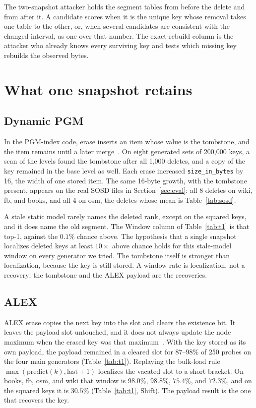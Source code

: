 \documentclass[conference]{IEEEtran}
\begin{document}
The two-snapshot attacker holds the segment tables from before the delete and from after it.
A candidate scores when it is the unique key whose removal takes one table to the other, or, when several candidates are consistent with the changed interval, as one over that number.
The exact-rebuild column is the attacker who already knows every surviving key and tests which missing key rebuilds the observed bytes.

\section{What one snapshot retains}
\label{sec:t1}

\subsection{Dynamic PGM}

In the PGM-index code, erase inserts an item whose value is the tombstone, and the item remains until a later merge~\cite{ferragina2020pgm}.
On eight generated sets of 200{,}000 keys, a scan of the levels found the tombstone after all 1{,}000 deletes, and a copy of the key remained in the base level as well.
Each erase increased \texttt{size\_in\_bytes} by 16, the width of one stored item.
The same 16-byte growth, with the tombstone present, appears on the real SOSD files in Section~\ref{sec:eval}: all 8 deletes on wiki, fb, and books, and all 4 on osm, the deletes whose mean is Table~\ref{tab:sosd}.

A stale static model rarely names the deleted rank, except on the squared keys, and it does name the old segment.
The Window column of Table~\ref{tab:t1} is that top-1, against the $0.1\%$ chance above.
The hypothesis that a single snapshot localizes deleted keys at least $10\times$ above chance holds for this stale-model window on every generator we tried.
The tombstone itself is stronger than localization, because the key is still stored.
A window rate is localization, not a recovery; the tombstone and the ALEX payload are the recoveries.

\subsection{ALEX}

ALEX erase copies the next key into the slot and clears the existence bit.
It leaves the payload slot untouched, and it does not always update the node maximum when the erased key was that maximum~\cite{ding2020alex}.
With the key stored as its own payload, the payload remained in a cleared slot for $87$--$98\%$ of 250 probes on the four main generators (Table~\ref{tab:t1}).
Replaying the bulk-load rule $\max(\mathrm{predict}(k),\mathrm{last}+1)$ localizes the vacated slot to a short bracket.
On books, fb, osm, and wiki that window is $98.0\%$, $98.8\%$, $75.4\%$, and $72.3\%$, and on the squared keys it is $30.5\%$ (Table~\ref{tab:t1}, Shift).
The payload result is the one that recovers the key.
\end{document}
